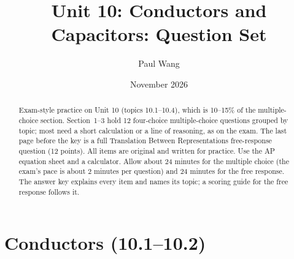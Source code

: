 \documentclass[11pt]{article}
\title{Unit 10: Conductors and Capacitors: Question Set}
\author{Paul Wang}
\date{November 2026}
\begin{document}
\maketitle

\begin{abstract}
Exam-style practice on Unit 10 (topics 10.1--10.4), which is 10--15\% of the multiple-choice section. Section~1--3 hold 12 four-choice multiple-choice questions grouped by topic; most need a short calculation or a line of reasoning, as on the exam. The last page before the key is a full Translation Between Representations free-response question (12 points). All items are original and written for practice. Use the AP equation sheet and a calculator. Allow about 24 minutes for the multiple choice (the exam's pace is about 2 minutes per question) and 24 minutes for the free response. The answer key explains every item and names its topic; a scoring guide for the free response follows it.
\end{abstract}


\section{Conductors (10.1--10.2)}
\end{document}
